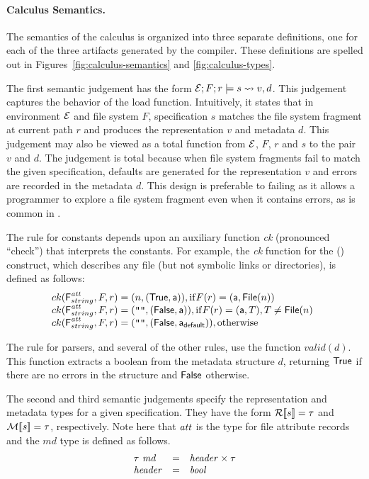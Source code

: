 \paragraph*{Calculus Semantics.}
%
The semantics of the calculus is organized into three separate
definitions, one for each of the three artifacts generated by the
\forest{} compiler. These definitions are spelled out in
Figures~\ref{fig:calculus-semantics} and \ref{fig:calculus-types}.

The first semantic judgement has the form $\mathcal{E};F;r \models s \rightsquigarrow
v,d$.  This judgement captures the behavior of the load function.
Intuitively, it states that in environment $\mathcal{E}$ and file system $F$,
specification $s$ matches the file system fragment at current path $r$
and produces the representation $v$ and metadata $d$.  This judgement
may also be viewed as a total function from $\mathcal{E}$, $F$, $r$ and $s$
to the pair $v$ and $d$.  The judgement is total because when file
system fragments fail to match the given specification, defaults are
generated for the representation $v$ and errors are recorded in the
metadata $d$.  This design is preferable to failing as it allows a
programmer to explore a file system fragment even when it contains
errors, as is common in \filestores{}.

The rule for constants depends upon an auxiliary function 
{\it ck} (pronounced ``check'') that interprets the constants.  For
example, the {\it ck} function for the (\pfile) construct, which
describes any file (but not symbolic links or directories), is defined
as follows:
\[
\begin{array}{@{}l}
ck(\mbox{\sf F}^{\metapdty}_{\stringty},F,r) = (n,(\True,\att)), \mathrm{if } F(r) = (\att,\File{n}) \\
ck(\mbox{\sf F}^{\metapdty}_{\stringty},F,r) = (\texttt{""},(\False,\att)), \mathrm{if } F(r) = (\att,T), T \not=\File{n} \\
ck(\mbox{\sf F}^{\metapdty}_{\stringty},F,r) = (\texttt{""},(\False,\defaultatt)), \mathrm{otherwise}
\end{array}
\]

The rule for \padshaskell{} parsers, and several of the other rules,
use the function $valid(d)$.  This function extracts a boolean from
the metadata structure $d$, returning $\mathsf{True}$ if there are no errors
in the structure and $\mathsf{False}$ otherwise. 

The second and third semantic judgements specify the representation
and metadata types for a given specification.  They have the form
${\cal R}[\![ s ]\!] = \tau$ and ${\cal M}[\![ s ]\!] = \tau$, respectively.  Note here
that $\mathit{att}$ is the type for file attribute records and the 
$md$ type is defined as follows.
\[
\begin{array}{lcl}
\tau~\mathit{md} & = & \mathit{header} \times \tau \\
\mathit{header} & = & \mathit{bool} 
\end{array}
\]

